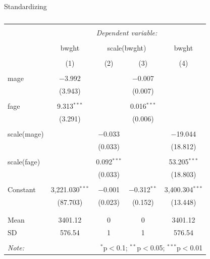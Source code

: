 \documentclass[
  ignorenonframetext,
]{beamer}
\begin{document}
\begin{frame}[fragile]{Standardizing}
\begin{table}[!htbp] \centering 
  \caption{} 
  \label{} 
\begin{tabular}{@{\extracolsep{5pt}}lcccc} 
\\[-1.8ex]\hline 
\hline \\[-1.8ex] 
 & \multicolumn{4}{c}{\textit{Dependent variable:}} \\ 
\cline{2-5} 
\\[-1.8ex] & bwght & \multicolumn{2}{c}{scale(bwght)} & bwght \\ 
\\[-1.8ex] & (1) & (2) & (3) & (4)\\ 
\hline \\[-1.8ex] 
 mage & $-$3.992 &  & $-$0.007 &  \\ 
  & (3.943) &  & (0.007) &  \\ 
  & & & & \\ 
 fage & 9.313$^{***}$ &  & 0.016$^{***}$ &  \\ 
  & (3.291) &  & (0.006) &  \\ 
  & & & & \\ 
 scale(mage) &  & $-$0.033 &  & $-$19.044 \\ 
  &  & (0.033) &  & (18.812) \\ 
  & & & & \\ 
 scale(fage) &  & 0.092$^{***}$ &  & 53.205$^{***}$ \\ 
  &  & (0.033) &  & (18.803) \\ 
  & & & & \\ 
 Constant & 3,221.030$^{***}$ & $-$0.001 & $-$0.312$^{**}$ & 3,400.304$^{***}$ \\ 
  & (87.703) & (0.023) & (0.152) & (13.448) \\ 
  & & & & \\ 
\hline \\[-1.8ex] 
Mean & 3401.12 & 0 & 0 & 3401.12 \\ 
SD & 576.54 & 1 & 1 & 576.54 \\ 
\hline 
\hline \\[-1.8ex] 
\textit{Note:}  & \multicolumn{4}{r}{$^{*}$p$<$0.1; $^{**}$p$<$0.05; $^{***}$p$<$0.01} \\ 
\end{tabular} 
\end{table}
\end{frame}
\end{document}
